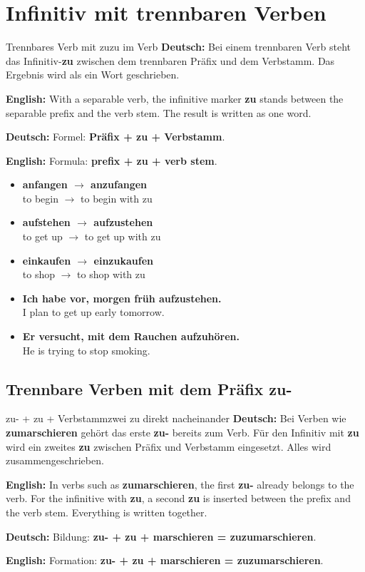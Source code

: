 \documentclass[a4paper,11pt]{article}
\newcommand{\GermanText}[1]{\textbf{Deutsch: }#1\par}
\newcommand{\EnglishText}[1]{{\small\color{SoftGray}\textbf{English: }#1\par}}
\newcommand{\ExampleItem}[2]{\item \textbf{#1}\\{\small\color{SoftGray}#2}}
\begin{document}
    \section{Infinitiv mit trennbaren Verben}

        \begin{grammarentry}{Trennbares Verb mit zu}{zu im Verb}
            \GermanText{Bei einem trennbaren Verb steht das Infinitiv-\textbf{zu} zwischen dem trennbaren Präfix und dem Verbstamm. Das Ergebnis wird als ein Wort geschrieben.}
            \EnglishText{With a separable verb, the infinitive marker \textbf{zu} stands between the separable prefix and the verb stem. The result is written as one word.}

            \GermanText{Formel: \textbf{Präfix + zu + Verbstamm}.}
            \EnglishText{Formula: \textbf{prefix + zu + verb stem}.}
        \end{grammarentry}

        \begin{exbox}
            \begin{itemize}
                \ExampleItem{anfangen $\rightarrow$ anzufangen}{to begin $\rightarrow$ to begin with zu}
                \ExampleItem{aufstehen $\rightarrow$ aufzustehen}{to get up $\rightarrow$ to get up with zu}
                \ExampleItem{einkaufen $\rightarrow$ einzukaufen}{to shop $\rightarrow$ to shop with zu}
                \ExampleItem{Ich habe vor, morgen früh aufzustehen.}{I plan to get up early tomorrow.}
                \ExampleItem{Er versucht, mit dem Rauchen aufzuhören.}{He is trying to stop smoking.}
            \end{itemize}
        \end{exbox}

        \subsection{Trennbare Verben mit dem Präfix \glqq zu-\grqq}

            \begin{grammarentry}{zu- + zu + Verbstamm}{zwei zu direkt nacheinander}
                \GermanText{Bei Verben wie \textbf{zumarschieren} gehört das erste \textbf{zu-} bereits zum Verb. Für den Infinitiv mit \textbf{zu} wird ein zweites \textbf{zu} zwischen Präfix und Verbstamm eingesetzt. Alles wird zusammengeschrieben.}
                \EnglishText{In verbs such as \textbf{zumarschieren}, the first \textbf{zu-} already belongs to the verb. For the infinitive with \textbf{zu}, a second \textbf{zu} is inserted between the prefix and the verb stem. Everything is written together.}

                \GermanText{Bildung: \textbf{zu- + zu + marschieren = zuzumarschieren}.}
                \EnglishText{Formation: \textbf{zu- + zu + marschieren = zuzumarschieren}.}
            \end{grammarentry}
\end{document}
